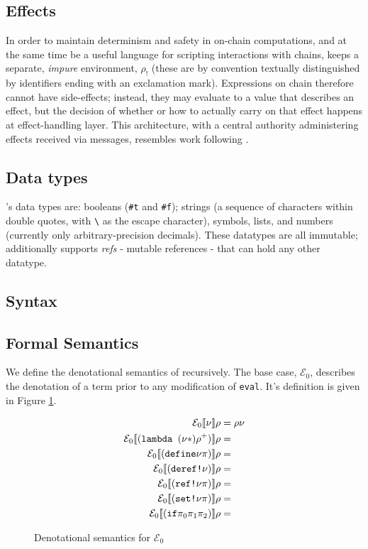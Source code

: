 \subsection{Effects} In order to maintain determinism and safety in on-chain
computations, and at the same time be a useful language for scripting
interactions with chains, \rad keeps a separate, \textit{impure} environment,
$\rho_{!}$ (these are by convention textually distinguished by identifiers
ending with an exclamation mark). Expressions on chain therefore cannot have
side-effects; instead, they may evaluate to a value that describes an effect,
but the decision of whether or how to actually carry on that effect happens at
effect-handling layer. This architecture, with a central authority
administering effects received via messages, resembles work following
\cite{Cartwright1994}.

\subsection{Data types} \rad's data types are: booleans (\texttt{\#t} and
\texttt{\#f}); strings (a sequence of characters within double quotes, with
\texttt{\textbackslash} as the escape character), symbols, lists, and numbers
(currently only arbitrary-precision decimals). These datatypes are all
immutable; additionally \rad supports \textit{refs} - mutable references - that
can hold any other datatype.

\subsection{Syntax}


\subsection{Formal Semantics} We define the denotational semantics of \rad
recursively. The base case, $\mathcal{E}_{0}$, describes the denotation of a
term prior to any modification of \texttt{eval}. It's definition is given in
Figure \ref{f:denotationalsem0}.


\begin{figure}[H]
\begin{align*}
  \mathcal{E}_{0} \llbracket \nu \rrbracket \rho &= \rho \nu  \\
  \mathcal{E}_{0} \llbracket (\text{\texttt{lambda }} (\nu *) \rho^{+}) \rrbracket \rho &=   \\
  \mathcal{E}_{0} \llbracket (\text{\texttt{define}} \nu \pi ) \rrbracket \rho &=   \\
  \mathcal{E}_{0} \llbracket (\text{\texttt{deref!}} \nu  ) \rrbracket \rho &=   \\
  \mathcal{E}_{0} \llbracket (\text{\texttt{ref!}} \nu \pi) \rrbracket \rho &=   \\
  \mathcal{E}_{0} \llbracket (\text{\texttt{set!}} \nu \pi) \rrbracket \rho &=   \\
  \mathcal{E}_{0} \llbracket (\text{\texttt{if}} \pi_0 \pi_1 \pi_2) \rrbracket \rho &=  
\end{align*}
\caption{Denotational semantics for $\mathcal{E}_{0}$}
\label{f:denotationalsem0}
\end{figure}

